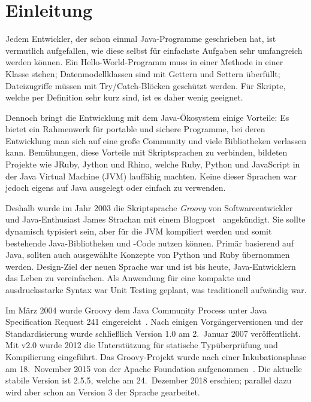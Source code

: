 \documentclass[a4paper]{article}
\title{\paperTitle}
\author{\paperAuthor}
\date{\paperDate}
\begin{document}

\maketitle


\section{Einleitung}\label{sec:einleitung}

Jedem Entwickler, der schon einmal Java-Programme geschrieben hat, ist vermutlich aufgefallen, wie diese selbst für einfachste Aufgaben sehr umfangreich werden können.
Ein Hello-World-Programm muss in einer Methode in einer Klasse stehen;
Datenmodellklassen sind mit Gettern und Settern überfüllt;
Dateizugriffe müssen mit Try/Catch-Blöcken geschützt werden.
Für Skripte, welche per Definition sehr kurz sind, ist es daher wenig geeignet.

Dennoch bringt die Entwicklung mit dem Java-Ökosystem einige Vorteile:
Es bietet ein Rahmenwerk für portable und sichere Programme, bei deren Entwicklung man sich auf eine große Community und viele Bibliotheken verlassen kann.
Bemühungen, diese Vorteile mit Skriptsprachen zu verbinden, bildeten Projekte wie JRuby, Jython und Rhino, welche Ruby, Python und JavaScript in der Java Virtual Machine (JVM) lauffähig machten.
Keine dieser Sprachen war jedoch eigens auf Java ausgelegt oder einfach zu verwenden.

Deshalb wurde im Jahr 2003 die Skriptsprache \emph{Groovy} von Softwareentwickler und Java-Enthusiast James Strachan mit einem Blogpost~\cite{james-strachan-blog} angekündigt.
Sie sollte dynamisch typisiert sein, aber für die JVM kompiliert werden und somit bestehende Java-Bibliotheken und -Code nutzen können.
Primär basierend auf Java, sollten auch ausgewählte Konzepte von Python und Ruby übernommen werden.
Design-Ziel der neuen Sprache war und ist bis heute, Java-Entwicklern das Leben zu vereinfachen.
Als Anwendung für eine kompakte und ausdrucksstarke Syntax war Unit Testing geplant, was traditionell aufwändig war.

Im März 2004 wurde Groovy dem Java Community Process unter Java Specification Request 241 eingereicht~\cite{jcp:jsr241}.
Nach einigen Vorgängerversionen und der Standardisierung wurde schließlich Version 1.0 am 2.~Januar 2007 veröffentlicht.
Mit v2.0 wurde 2012 die Unterstützung für statische Typüberprüfung und Kompilierung eingeführt.
Das Groovy-Projekt wurde nach einer Inkubationsphase am 18.~November 2015 von der Apache Foundation aufgenommen~\cite{apache-incubator:groovy}.
Die aktuelle stabile Version ist 2.5.5, welche am 24.~Dezember 2018 erschien; parallel dazu wird aber schon an Version 3 der Sprache gearbeitet.
\end{document}
